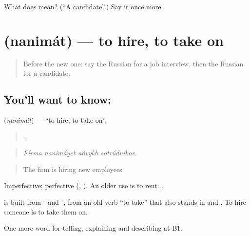 \begin{tcolorbox}[breakable,colback=teal!4,colframe=teal!35!black,title={Before you move on}]
What does  mean? (\textquotedblleft{}A candidate\textquotedblright{}.) Say it once more.
\end{tcolorbox}
\section[\texorpdfstring{\ru{нанимать} (nanimát)}{нанимать (nanimát)}]{ (nanimát) — to hire, to take on}

\label{lesson:RU-C358-nanimat}



\begin{quote}
Before the new one: say the Russian for a job interview, then the Russian for a candidate.
\end{quote}

\subsection*{You'll want to know: }
\textbf{} (\emph{nanimát}) — \textquotedblleft{}to hire, to take on\textquotedblright{}.

\begin{quote}
   .
\end{quote}

\begin{quote}
\emph{Fírma nanimáyet nóvykh sotrúdnikov.}
\end{quote}

\begin{quote}
The firm is hiring new employees.
\end{quote}

Imperfective; perfective \emph{} (\emph{, }). An older use is to rent: \emph{ }.

\begin{cousinweb}
\textbf{} is built from \emph{-} and \emph{-}, from an old verb \textquotedblleft{}to take\textquotedblright{} that also stands in \emph{} and \emph{}. To hire someone is to take them on.
\end{cousinweb}

\begin{grammarlens}[title={What you've built}]
One more word for telling, explaining and describing at B1.
\end{grammarlens}

